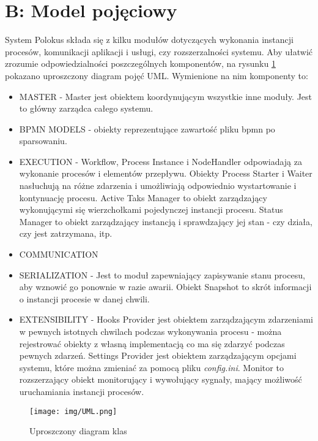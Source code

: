 \documentclass[declaration,shortabstract,mgr]{iithesis}
\newcommand{\bpmn}{BPMN }
\begin{document}
\newpage
\section*{B: Model pojęciowy}
System Polokus składa się z kilku modułów dotyczących wykonania instancji procesów, komunikacji aplikacji i usługi, czy rozszerzalności systemu. Aby ułatwić zrozumie odpowiedzialności poszczególnych komponentów, na rysunku \ref{fig:uml} pokazano uproszczony diagram pojęć UML. Wymienione na nim komponenty to:
\begin{itemize}
    \item MASTER - Master jest obiektem koordynującym wszystkie inne moduły. Jest to główny zarządca całego systemu.
    \item BPMN MODELS - obiekty reprezentujące zawartość pliku bpmn po sparsowaniu.
    \item EXECUTION - Workflow, Process Instance i NodeHandler odpowiadają za wykonanie procesów i elementów przepływu. Obiekty Process Starter i Waiter nasłuchują na różne zdarzenia i umożliwiają odpowiednio wystartowanie i kontynuację procesu. Active Taks Manager to obiekt zarządzający wykonującymi się wierzchołkami pojedynczej instancji procesu. Status Manager to obiekt zarządzający instancją i sprawdzający jej stan - czy działa, czy jest zatrzymana, itp.
    \item COMMUNICATION
    \item SERIALIZATION - Jest to moduł zapewniający zapisywanie stanu procesu, aby wznowić go ponownie w razie awarii. Obiekt Snapshot to skrót informacji o instancji procesie w danej chwili.
    \item EXTENSIBILITY - Hooks Provider jest obiektem zarządzającym zdarzeniami w pewnych istotnych chwilach podczas wykonywania procesu - można rejestrować obiekty z własną implementacją co ma się zdarzyć podczas pewnych zdarzeń. Settings Provider jest obiektem zarządzającym opcjami systemu, które można zmieniać za pomocą pliku \textit{config.ini}. Monitor to rozszerzający obiekt monitorujący i wywołujący sygnały, mający możliwość uruchamiania instancji procesów.    
\end{itemize}

\newpage
\begin{figure}[H]
    \texttt{[image: img/UML.png]}
    \caption{Uproszczony diagram klas}
    \label{fig:uml}
\end{figure}
 \clearpage


\end{document}
